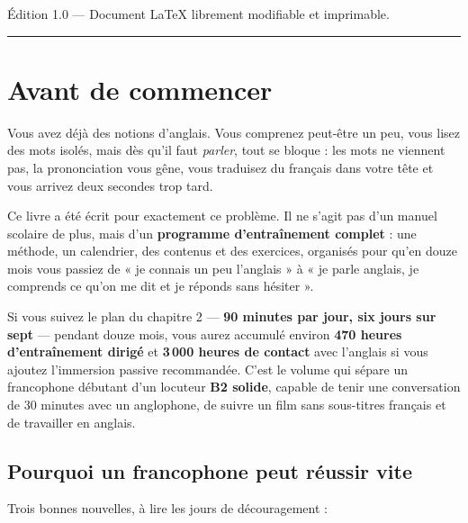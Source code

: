 \begin{titlepage}
\begin{center}
\vfill

{\color{gris}\small Édition 1.0 --- Document LaTeX librement modifiable et imprimable.\par}
\vspace{0.3cm}
{\color{orange}\rule{\linewidth}{2.5pt}}

\end{center}
\end{titlepage}

\chapter*{Avant de commencer}

Vous avez déjà des notions d'anglais. Vous comprenez peut-être un peu, vous lisez des mots
isolés, mais dès qu'il faut \emph{parler}, tout se bloque : les mots ne viennent pas, la
prononciation vous gêne, vous traduisez du français dans votre tête et vous arrivez deux
secondes trop tard.

Ce livre a été écrit pour exactement ce problème. Il ne s'agit pas d'un manuel scolaire de
plus, mais d'un \textbf{programme d'entraînement complet} : une méthode, un calendrier, des
contenus et des exercices, organisés pour qu'en douze mois vous passiez de « je connais
un peu l'anglais » à « je parle anglais, je comprends ce qu'on me dit et je réponds sans
hésiter ».

\begin{memo}
Si vous suivez le plan du chapitre 2 --- \textbf{90 minutes par jour, six jours sur sept} ---
pendant douze mois, vous aurez accumulé environ \textbf{470 heures d'entraînement dirigé}
et \textbf{3\,000 heures de contact} avec l'anglais si vous ajoutez l'immersion passive
recommandée. C'est le volume qui sépare un francophone débutant d'un locuteur \textbf{B2
solide}, capable de tenir une conversation de 30 minutes avec un anglophone, de suivre un
film sans sous-titres français et de travailler en anglais.
\end{memo}

\section*{Pourquoi un francophone peut réussir vite}
Trois bonnes nouvelles, à lire les jours de découragement :

